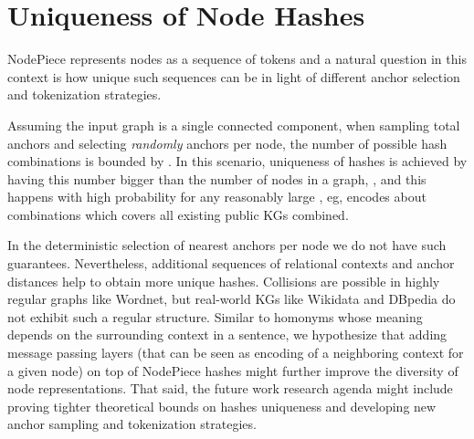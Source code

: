 \documentclass{article} \usepackage{iclr2022_conference,times}
\begin{document}
\section{Uniqueness of Node Hashes}
\label{app:hash_uniq}

NodePiece represents nodes as a sequence of tokens and a natural question in this context is how unique such sequences can be in light of different anchor selection and tokenization strategies. 

Assuming the input graph is a single connected component, when sampling  total anchors and selecting \emph{randomly}  anchors per node, the number of possible hash combinations is bounded by . In this scenario, uniqueness of hashes is achieved by having this number bigger than the number  of nodes in a graph, , and this happens with high probability for any reasonably large , eg,  encodes about  combinations which covers all existing public KGs combined.

In the deterministic selection of nearest anchors per node we do not have such guarantees. Nevertheless, additional sequences of relational contexts and anchor distances help to obtain more unique hashes. Collisions are possible in highly regular graphs like Wordnet, but real-world KGs like Wikidata and DBpedia do not exhibit such a regular structure. Similar to homonyms whose meaning depends on the surrounding context in a sentence, we hypothesize that adding message passing layers (that can be seen as encoding of a neighboring context for a given node) on top of NodePiece hashes might further improve the diversity of node representations. 
That said, the future work research agenda might include proving tighter theoretical bounds on hashes uniqueness and developing new anchor sampling and tokenization strategies.
\end{document}
